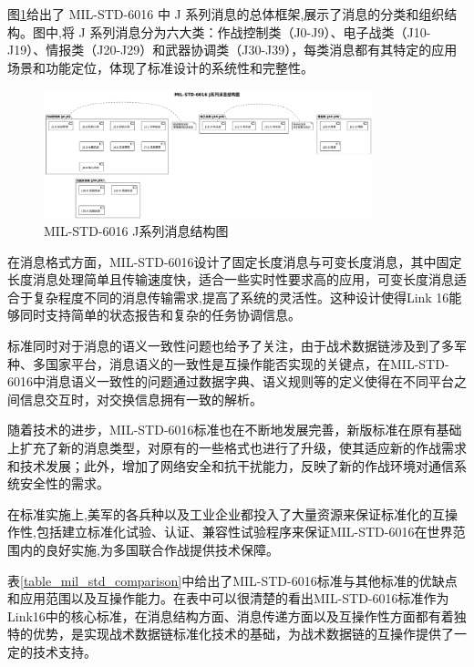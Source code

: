 图\ref{fig_j_series_message_structure}给出了 MIL-STD-6016 中 J 系列消息的总体框架,展示了消息的分类和组织结构。图中,将 J 系列消息分为六大类：作战控制类（J0-J9）、电子战类（J10-J19）、情报类（J20-J29）和武器协调类（J30-J39），每类消息都有其特定的应用场景和功能定位，体现了标准设计的系统性和完整性。

\begin{figure}[H]
    \centering
    \includegraphics[width=0.85\textwidth,height=0.6\textheight,keepaspectratio]{chapters/fig-0/j_series_message_structure.png}
    \caption{MIL-STD-6016 J系列消息结构图}
    \label{fig_j_series_message_structure}
\end{figure}

在消息格式方面，MIL-STD-6016设计了固定长度消息与可变长度消息，其中固定长度消息处理简单且传输速度快，适合一些实时性要求高的应用，可变长度消息适合于复杂程度不同的消息传输需求,提高了系统的灵活性。这种设计使得Link 16能够同时支持简单的状态报告和复杂的任务协调信息。

标准同时对于消息的语义一致性问题也给予了关注，由于战术数据链涉及到了多军种、多国家平台，消息语义的一致性是互操作能否实现的关键点，在MIL-STD-6016中消息语义一致性的问题通过数据字典、语义规则等的定义使得在不同平台之间信息交互时，对交换信息拥有一致的解析。

随着技术的进步，MIL-STD-6016标准也在不断地发展完善，新版标准在原有基础上扩充了新的消息类型，对原有的一些格式也进行了升级，使其适应新的作战需求和技术发展；此外，增加了网络安全和抗干扰能力，反映了新的作战环境对通信系统安全性的需求。

在标准实施上,美军的各兵种以及工业企业都投入了大量资源来保证标准化的互操作性,包括建立标准化试验、认证、兼容性试验程序来保证MIL-STD-6016在世界范围内的良好实施,为多国联合作战提供技术保障。

表\ref{table_mil_std_comparison}中给出了MIL-STD-6016标准与其他标准的优缺点和应用范围以及互操作能力。在表中可以很清楚的看出MIL-STD-6016标准作为Link16中的核心标准，在消息结构方面、消息传递方面以及互操作性方面都有着独特的优势，是实现战术数据链标准化技术的基础，为战术数据链的互操作提供了一定的技术支持。

